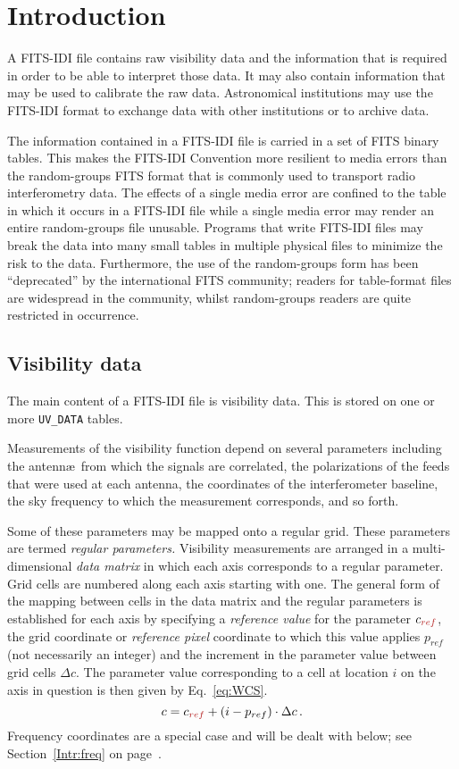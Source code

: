 \documentclass[twoside]{article}
\newcommand{\Hi}[1]{\textcolor{hicol}{#1}}
\begin{document}
\section{Introduction}

A FITS-IDI file contains raw visibility data and the information that
is required in order to be able to interpret those data.  It may also
contain information that may be used to calibrate the raw data.
Astronomical institutions may use the FITS-IDI format to exchange data
with other institutions or to archive data.

The information contained in a FITS-IDI file is carried in a set of
FITS binary tables.  This makes the FITS-IDI \Hi{Convention} more
resilient to media errors than the random-groups FITS format that is
commonly used to transport radio interferometry data.  The effects of
a single media error are confined to the table in which it occurs in a
FITS-IDI file while a single media error may render an entire
random-groups file unusable.  Programs that write FITS-IDI files may
break the data into many small tables \Hi{in multiple physical files}
to minimize the risk to the data.  \Hi{Furthermore, the use of the
random-groups form has been ``deprecated'' by the international FITS
community; readers for table-format files are widespread in the
community, whilst random-groups readers are quite restricted in
occurrence.}

\subsection{Visibility data}
\label{Intr:visdata}

The main content of a FITS-IDI file is visibility data.  This is
stored on one or more {\tt UV\_DATA} tables.

Measurements of the visibility function depend on several parameters
including the antenn\ae\ from which the signals are correlated, the
polarizations of the feeds that were used at each antenna, the
coordinates of the interferometer baseline, the sky frequency to which
the measurement corresponds, \Hi{and so forth}.

Some of these parameters may be mapped onto a regular grid.  These
parameters are termed {\it regular parameters.}  Visibility
measurements are arranged in a multi-dimensional {\it data matrix} in
which each axis corresponds to a regular parameter.  Grid cells are
numbered along each axis starting with one.  The general form of the
mapping between cells in the data matrix and the regular parameters is
established for each axis by specifying a {\it reference value} for
the parameter $c_{\Hi{ref}}$, the grid coordinate or {\it reference pixel}
coordinate to which this value applies $p_{ref}$ (not necessarily an
integer) and the increment in the parameter value between grid cells
$\Delta c$.  The parameter value corresponding to a cell at location
$i$ on the axis in question is then given by Eq.~\ref{eq:WCS}.
\begin{equation}
c = c_{\Hi{ref}} + (i - p_{ref}) \cdot \Delta c   \label{eq:WCS} \, .
\end{equation}
Frequency coordinates are a special case and will be dealt with
below; see Section~\ref{Intr:freq} on page~\pageref{Intr:freq}.
\end{document}
